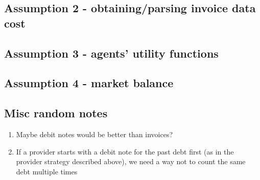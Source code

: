 \documentclass{article}
\begin{document}
\subsection{Assumption 2 - obtaining/parsing invoice data cost}
\subsection{Assumption 3 - agents' utility functions}
\subsection{Assumption 4 - market balance}
\subsection{Misc random notes}
\begin{enumerate}
    \item Maybe debit notes would be better than invoices?
    \item If a provider starts with a debit note for the past debt first (as in the provider strategy described above), we need a way not to count the
        same debt multiple times
\end{enumerate}
\end{document}
